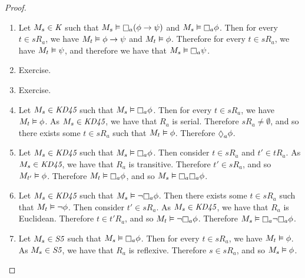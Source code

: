 \begin{proof}
\begin{enumerate}
\item Let $M_s \in \textit{K}{}$ such that $M_s \entails \knows_a (\phi \implies \psi)$
and $M_s \entails \knows_a \phi$. Then for every $t \in sR_a$, we have $M_t
\vDash \phi \rightarrow \psi$ and $M_t \vDash \phi$. Therefore for every $t \in sR_a$,
we have $M_t \vDash \psi$, and therefore we have that $M_s \entails \knows_a \psi$.
\item Exercise.
\item Exercise.
\item Let $M_s \in \textit{KD45}{}$ such that $M_s \entails \knows_a \phi$. Then for
every $t \in sR_a$, we have $M_t \vDash \phi$. As $M_s \in \textit{KD45}{}$, we have
that $R_a$ is serial. Therefore $sR_a \neq \emptyset$, and so there exists some
$t \in sR_a$ such that $M_t \vDash \phi$. Therefore $\suspects_a \phi$.
\item Let $M_s \in \textit{KD45}{}$ such that $M_s \entails \knows_a \phi$. Then
consider $t \in sR_a$ and $t' \in tR_a$. As $M_s \in \textit{KD45}{}$, we have that
$R_a$ is transitive. Therefore $t' \in sR_a$, and so $M_{t'} \vDash \phi$.
Therefore $M_t \entails \knows_a \phi$, and so $M_s \entails \knows_a \knows_a \phi$. 
\item Let $M_s \in \textit{KD45}{}$ such that $M_s \entails \neg \knows_a \phi$. Then
there exists some $t \in sR_a$ such that $M_t \vDash \neg \phi$. Then consider
$t' \in sR_a$. As $M_s \in \textit{KD45}{}$, we have that $R_a$ is Euclidean.
Therefore $t \in t'R_a$, and so $M_t \entails \neg \knows_a \phi$. Therefore $M_s
\entails \knows_a \neg \knows_a \phi$.
\item Let $M_s \in \textit{S5}{}$ such that $M_s \entails \knows_a \phi$. Then for
every $t \in sR_a$, we have $M_t \vDash \phi$. As $M_s \in \textit{S5}{}$, we have
that $R_a$ is reflexive. Therefore $s \in sR_a$, and so $M_s \vDash \phi$.
\end{enumerate}
\end{proof}

